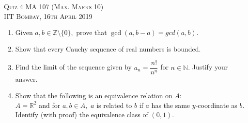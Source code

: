 \documentclass{article}
\begin{document}
\begin{center}
    \textsc{Quiz 4 MA 107 (Max. Marks 10)}\\
    \textsc{IIT Bombay, 16th April 2019}
\end{center}
\begin{enumerate}[label = (\arabic*)]
    \item Given $a, b \in \mathbb{Z}\setminus\{0\},$ prove that $\gcd(a, b-a) = gcd(a, b).$
    \item Show that every Cauchy sequence of real numbers is bounded.
    \item Find the limit of the sequence given by $a_n = \dfrac{n!}{n^n}$ for $n \in \mathbb{N}.$ Justify your answer.
    \item Show that the following is an equivalence relation on $A:$\\
    $A = \mathbb{R}^2$ and for $a, b \in A,$ $a$ is related to $b$ if $a$ has the same $y$-coordinate as $b.$\\
    Identify (with proof) the equivalence class of $(0, 1).$
\end{enumerate}
\end{document}
